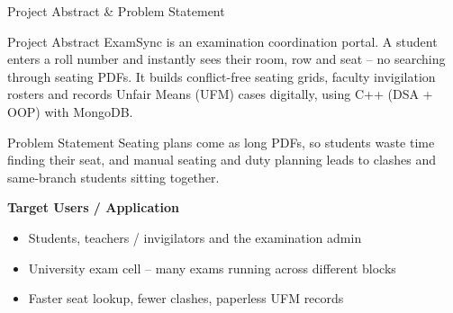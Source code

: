 \documentclass[aspectratio=169,11pt]{beamer}
\begin{document}
\begin{frame}{Project Abstract \& Problem Statement}

\begin{block}{Project Abstract}
\footnotesize
ExamSync is an examination coordination portal. A student enters a roll number
and instantly sees their room, row and seat -- no searching through seating PDFs.
It builds conflict-free seating grids, faculty invigilation rosters and records
Unfair Means (UFM) cases digitally, using C++ (DSA + OOP) with MongoDB.
\end{block}

\vspace{0mm}

\begin{block}{Problem Statement}
\footnotesize
Seating plans come as long PDFs, so students waste time finding their seat, and
manual seating and duty planning leads to clashes and same-branch students
sitting together.
\end{block}

\vspace{-1.5mm}

\textbf{\color{GEUBlue}Target Users / Application}

\begin{itemize}\itemsep1pt
    \footnotesize
    \item Students, teachers / invigilators and the examination admin
    \item University exam cell -- many exams running across different blocks
    \item Faster seat lookup, fewer clashes, paperless UFM records
\end{itemize}

\end{frame}
\end{document}
